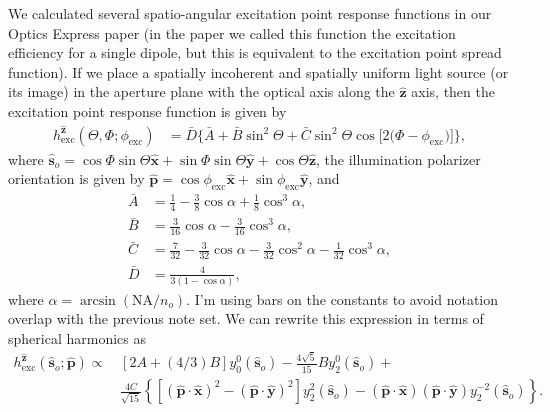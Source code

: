 \documentclass[11pt]{article}
\providecommand{\so}[1]{\mathbf{\hat{s}}_o}
\providecommand{\mh}[1]{\mathbf{\hat{#1}}}
\begin{document}
We calculated several spatio-angular excitation point response functions in our
Optics Express paper \cite{chandler17} (in the paper we called this function the
excitation efficiency for a single dipole, but this is equivalent to the
excitation point spread function). If we place a spatially incoherent and
spatially uniform light source (or its image) in the aperture plane with the
optical axis along the $\mh{z}$ axis, then the excitation point response function
is given by
\begin{align}
  h^{\mh{z}}_{\text{exc}}(\Theta, \Phi; \phi_{\text{exc}}) &= \bar{D}\{\bar{A} + \bar{B}\sin^{2}{\Theta} + \bar{C}\sin^{2}{\Theta} \cos{[2 (\Phi - \phi_{\text{exc}}})]\}\label{eq:scalarabs},
\end{align}
where
$\so{} = \cos\Phi\sin\Theta\mh{x} + \sin\Phi\sin\Theta\mh{y} + \cos\Theta\mh{z}$,
the illumination polarizer orientation is given by $\mh{p} = \cos\phi_{\text{exc}}\mh{x} + \sin\phi_{\text{exc}}\mh{y}$, and 
\begin{subequations}
\begin{align}
  \bar{A} &= \frac{1}{4} - \frac{3}{8} \cos{\alpha } + \frac{1}{8} \cos^{3}{\alpha },\\
  \bar{B} &= \frac{3}{16} \cos{\alpha } - \frac{3}{16} \cos^{3}{\alpha },\\
  \bar{C} &= \frac{7}{32} - \frac{3}{32} \cos{\alpha } - \frac{3}{32} \cos^{2}{\alpha } - \frac{1}{32} \cos^{3}{\alpha},\\
  \bar{D} &= \frac{4}{3(1 - \cos\alpha)},
\end{align}\label{eq:coefficients}%
\end{subequations}
where $\alpha = \arcsin(\text{NA}/n_o)$. I'm using bars on the constants to
avoid notation overlap with the previous note set. We can rewrite this
expression in terms of spherical harmonics as
\begin{align}
  h^{\mh{z}}_{\text{exc}}(\so{}; \mh{p}) \propto\, &[2A + (4/3)B]y_0^0(\so{}) - \frac{4\sqrt{5}}{15}By_2^0(\so{}) + \nonumber\\ &\frac{4C}{\sqrt{15}}\left\{[(\mh{p}\cdot\mh{x})^2 - (\mh{p}\cdot\mh{y})^2]y_2^2(\so{}) - (\mh{p}\cdot\mh{x})(\mh{p}\cdot\mh{y})y_2^{-2}(\so{})\right\}. \label{eq:genpsf}
\end{align}
\end{document}
